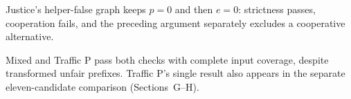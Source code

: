 Justice's helper-false graph keeps $p=0$ and then $e=0$: strictness passes, cooperation fails, and the preceding argument separately excludes a cooperative alternative.

Mixed and Traffic P pass both checks with complete input coverage,
despite transformed unfair prefixes. Traffic P's single result also
appears in the separate eleven-candidate comparison (Sections~G--H).

